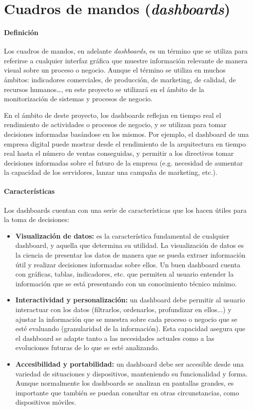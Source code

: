 \newpage{}
\section{Cuadros de mandos (\textit{dashboards})}\label{sec:dashboards}
\paragraph{Definición}
Los cuadros de mandos, en adelante \textit{dashboards},
es un término que se utiliza para referirse a cualquier interfaz gráfica que
muestre información relevante de manera visual sobre un proceso o negocio.
Aunque el término se utiliza en muchos ámbitos: indicadores comerciales, de
producción, de marketing, de calidad, de recursos humanos\ldots, en este
proyecto se utilizará en el ámbito de la monitorización de sistemas y procesos
de negocio.

En el ámbito de deste proyecto, los dashboards reflejan en tiempo real el
rendimiento de actividades o procesos de negocio, y se utilizan para tomar
decisiones informadas basándose en los mismos. Por ejemplo, el dashboard de una
empresa digital puede mostrar desde el rendimiento de la arquitectura en tiempo
real hasta el número de ventas conseguidas, y permitir a los directivos tomar
decisiones informadas sobre el futuro de la empresa (e.g. necesidad de aumentar
la capacidad de los servidores, lanzar una campaña de marketing, etc.).

\paragraph{Características}
Los dashboards cuentan con una serie de características que los hacen útiles
para la toma de decisiones:~\cite{mier2023dashboards}

\begin{itemize}
	\item \textbf{Visualización de datos:} es la característica fundamental de
		cualquier dashboard, y aquella que determina su utilidad.
		La visualización de datos es la ciencia de presentar los datos de manera
		que se pueda extraer información útil y realizar decisiones informadas
		sobre ellos. Un buen dashboard cuenta con gráficas, tablas, indicadores,
		etc. que permiten al usuario entender la información que se está
		presentando con un conocimiento técnico mínimo.
	\item \textbf{Interactividad y personalización:} un dashboard debe permitir
		al usuario interactuar con los datos (filtrarlos, ordenarlos,
		profundizar en ellos...) y ajustar la información que se muestra sobre
		cada proceso o negocio que se esté evaluando (granularidad de la
		información). Esta capacidad asegura que el dashboard se adapte tanto a
		las necesidades actuales como a las evoluciones futuras de lo que se
		esté analizando.
	\item \textbf{Accesibilidad y portabilidad:} un dashboard debe ser accesible
		desde una variedad de situaciones y dispositivos, manteniendo su
		funcionalidad y forma. Aunque normalmente los dashboards se analizan en
		pantallas grandes, es importante que también se puedan consultar en
		otras circunstancias, como dispositivos móviles.
\end{itemize}


